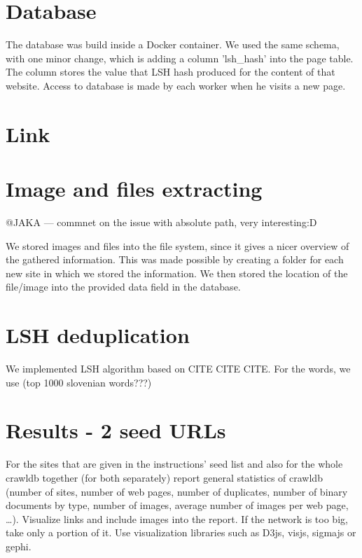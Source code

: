 \documentclass[9pt]{IEEEtran}
\begin{document}
\section{Database}
The database was build inside a Docker container. We used the same schema, with one minor change, which is adding a column 'lsh\_hash' into the page table. The column stores the value that LSH hash produced for the content of that website. Access to database is made by each worker when he visits a new page. 







\section{Link}


\section{Image and files extracting}
@JAKA --- commnet on the issue with absolute path, very interesting:D

We stored images and files into the file system, since it gives a nicer overview of the gathered information. This was made possible by creating a folder for each new site in which we stored the information. We then stored the location of the file/image into the provided data field in the database.




\section{LSH deduplication}
We implemented LSH algorithm based on CITE CITE CITE. For the words, we use (top 1000 slovenian words???)




\section{Results - 2 seed URLs}

For the sites that are given in the instructions’ seed list and also for the whole crawldb together (for both separately) report general statistics of crawldb (number of sites, number of web pages, number of duplicates, number of binary documents by type, number of images, average number of images per web page, …). Visualize links and include images into the report. If the network is too big, take only a portion of it. Use visualization libraries such as D3js, visjs, sigmajs or gephi.
\end{document}
